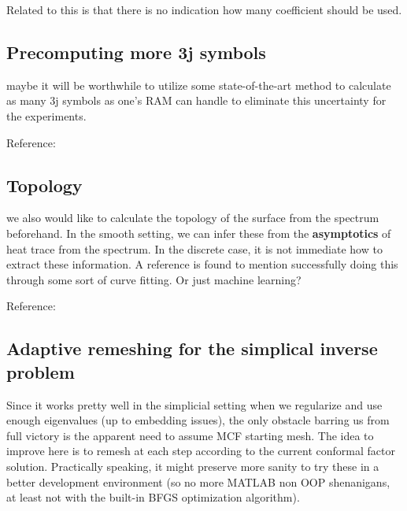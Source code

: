 \documentclass[11pt]{article}
\theoremstyle{definition}
\begin{document}
Related to this is that there is no indication how many coefficient should be used.

\subsection{Precomputing more 3j symbols}
maybe it will be worthwhile to utilize some state-of-the-art method to calculate as many 3j symbols as one's RAM can handle to eliminate this uncertainty for the experiments.

Reference: 

\subsection{Topology}
we also would like to calculate the topology of the surface from the spectrum beforehand. In the smooth setting, we can infer these from the \textbf{asymptotics} of heat trace from the spectrum. In the discrete case, it is not immediate how to extract these information. A reference is found to mention successfully doing this through some sort of curve fitting. Or just machine learning?

Reference: 

\subsection{Adaptive remeshing for the simplical inverse problem}
Since it works pretty well in the simplicial setting when we regularize and use enough eigenvalues (up to embedding issues), the only obstacle barring us from full victory is the apparent need to assume MCF starting mesh. The idea to improve here is to remesh at each step according to the current conformal factor solution. Practically speaking, it might preserve more sanity to try these in a better development environment (so no more MATLAB non OOP shenanigans, at least not with the built-in BFGS optimization algorithm).
\end{document}
